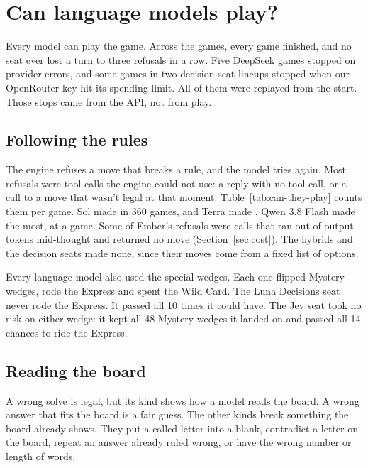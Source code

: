 \section{Can language models play?}\label{sec:can-they-play}

Every model can play the game. Across the \NumGames{} games, every game finished, and no seat ever lost a turn to three refusals in a row. Five DeepSeek games stopped on provider errors, and some games in two decision-seat lineups stopped when our OpenRouter key hit its spending limit. All of them were replayed from the start. Those stops came from the API, not from play.

\subsection{Following the rules}

The engine refuses a move that breaks a rule, and the model tries again. Most refusals were tool calls the engine could not use: a reply with no tool call, or a call to a move that wasn't legal at that moment. Table~\ref{tab:can-they-play} counts them per game. Sol made \SolRefusals{} in 360 games, and Terra made \TerraRefusals{}. Qwen 3.8 Flash made the most, at \QwenRefusalsPerGame{} a game. Some of Ember's refusals were calls that ran out of output tokens mid-thought and returned no move (Section~\ref{sec:cost}). The hybrids and the decision seats made none, since their moves come from a fixed list of options.

Every language model also used the special wedges. Each one flipped Mystery wedges, rode the Express and spent the Wild Card. The Luna Decisions seat never rode the Express. It passed all 10 times it could have. The Jev seat took no risk on either wedge: it kept all 48 Mystery wedges it landed on and passed all 14 chances to ride the Express.

\subsection{Reading the board}

A wrong solve is legal, but its kind shows how a model reads the board. A wrong answer that fits the board is a fair guess. The other kinds break something the board already shows. They put a called letter into a blank, contradict a letter on the board, repeat an answer already ruled wrong, or have the wrong number or length of words.

